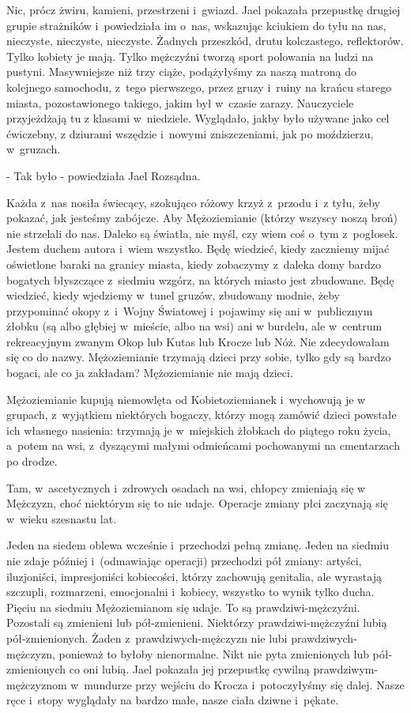 \documentclass[oneside,polish,12pt,sfheadings]{mwbk}
\begin{document}
Nic, prócz żwiru, kamieni, przestrzeni i~gwiazd. Jael pokazała przepustkę
drugiej grupie strażników i~powiedziała im o~nas, wskazując kciukiem
do tyłu na nas, nieczyste, nieczyste, nieczyste. Żadnych przeszkód,
drutu kolczastego, reflektorów. Tylko kobiety je mają. Tylko mężczyźni
tworzą sport polowania na ludzi na pustyni. Masywniejsze niż trzy
ciąże, podążyłyśmy za naszą matroną do kolejnego samochodu, z~tego
pierwszego, przez gruzy i~ruiny na krańcu starego miasta, pozostawionego
takiego, jakim był w~czasie zarazy. Nauczyciele przyjeżdżają tu z
klasami w~niedziele. Wyglądało, jakby było używane jako cel ćwiczebny,
z dziurami wszędzie i~nowymi zniszczeniami, jak po moździerzu, w~gruzach.

- Tak było - powiedziała Jael Rozsądna. 

Każda z~nas nosiła świecący,
szokująco różowy krzyż z~przodu i~z tyłu, żeby pokazać, jak jesteśmy
zabójcze. Aby Mężoziemianie (którzy wszyscy noszą broń) nie strzelali
do nas. Daleko są światła, nie myśl, czy wiem coś o~tym z~pogłosek.
Jestem duchem autora i~wiem wszystko. Będę wiedzieć, kiedy zaczniemy
mijać oświetlone baraki na granicy miasta, kiedy zobaczymy z~daleka
domy bardzo bogatych błyszczące z~siedmiu wzgórz, na których miasto
jest zbudowane. Będę wiedzieć, kiedy wjedziemy w~tunel gruzów, zbudowany
modnie, żeby przypominać okopy z~i~Wojny Światowej i~pojawimy się
ani w~publicznym żłobku (są albo głębiej w~mieście, albo na wsi) ani
w burdelu, ale w~centrum rekreacyjnym zwanym Okop lub Kutas lub Krocze
lub Nóż. Nie zdecydowałam się co do nazwy. Mężoziemianie trzymają
dzieci przy sobie, tylko gdy są bardzo bogaci, ale co ja zakładam?
Mężoziemianie nie mają dzieci.

Mężoziemianie kupują niemowlęta od Kobietoziemianek i~wychowują je w
grupach, z~wyjątkiem niektórych bogaczy, którzy mogą zamówić dzieci
powstałe ich własnego nasienia: trzymają je w~miejskich żłobkach do
piątego roku życia, a~potem na wsi, z~dyszącymi małymi odmieńcami
pochowanymi na cmentarzach po drodze.

Tam, w~ascetycznych i~zdrowych osadach na wsi, chłopcy zmieniają się
w Mężczyzn, choć niektórym się to nie udaje. Operacje zmiany płci
zaczynają się w~wieku szesnastu lat.

Jeden na siedem oblewa wcześnie i~przechodzi pełną zmianę. Jeden na
siedmiu nie zdaje później i~(odmawiając operacji) przechodzi pół zmiany:
artyści, iluzjoniści, impresjoniści kobiecości, którzy zachowują genitalia,
ale wyrastają szczupli, rozmarzeni, emocjonalni i~kobiecy, wszystko
to wynik tylko ducha. Pięciu na siedmiu Mężoziemianom się udaje. To
są prawdziwi-mężczyźni. Pozostali są zmienieni lub pół-zmienieni.
Niektórzy prawdziwi-mężczyźni lubią pół-zmienionych. Żaden z~prawdziwych-mężczyzn
nie lubi prawdziwych-mężczyzn, ponieważ to byłoby nienormalne. Nikt
nie pyta zmienionych lub pół-zmienionych co oni lubią. Jael pokazała
jej przepustkę cywilną prawdziwym-mężczyznom w~mundurze przy wejściu
do Krocza i~potoczyłyśmy się dalej. Nasze ręce i~stopy wyglądały na
bardzo małe, nasze ciała dziwne i~pękate.
\end{document}
